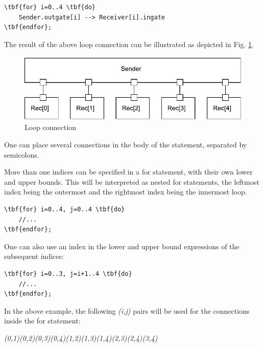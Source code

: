 \begin{Verbatim}[commandchars=\\\{\}]
\tbf{for} i=0..4 \tbf{do}
    Sender.outgate[i] --> Receiver[i].ingate
\tbf{endfor};
\end{Verbatim}



The result of the above loop connection can be illustrated as
depicted in Fig. \ref{fig:ch-ned-lang:loop-connection}.

\begin{figure}[htbp]
\begin{center}
\includegraphics[width=4.625in, height=1.297in]{figures/usmanFig7}
\caption{Loop connection}
\label{fig:ch-ned-lang:loop-connection}
\end{center}
\end{figure}


One can place several connections in the body of the
 statement, separated by semicolons.

More than one indices can be specified in a for statement, with their
own lower and upper bounds. This will be interpreted as nested for
statements, the leftmost index being
the outermost and the rightmost index being the innermost loop.


\begin{Verbatim}[commandchars=\\\{\}]
\tbf{for} i=0..4, j=0..4 \tbf{do}
    //...
\tbf{endfor};
\end{Verbatim}

One can also use an index in the lower and upper bound expressions
of the subsequent indices:

\begin{Verbatim}[commandchars=\\\{\}]
\tbf{for} i=0..3, j=i+1..4 \tbf{do}
    //...
\tbf{endfor};
\end{Verbatim}


In the above example, the following \textit{(i,j)} pairs will be used
for the connections inside the for statement:

\tab \textit{(0,1)\tab (0,2)\tab (0,3)\tab (0,4)\tab (1,2)\tab (1,3)\tab (1,4)\tab (2,3)\tab (2,4)\tab (3,4)}

